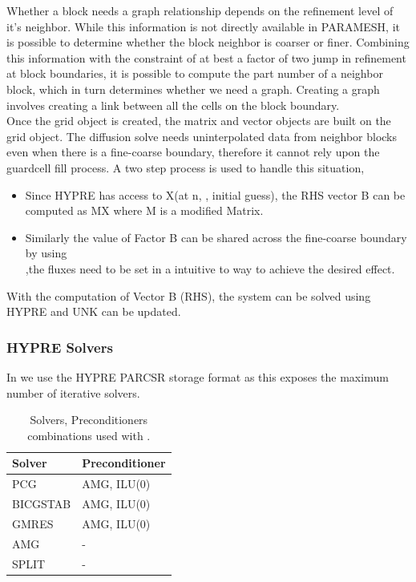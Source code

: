 Whether a block needs a graph relationship depends on the refinement
level of it's neighbor. While this information is not directly
available in PARAMESH, it is possible to determine whether the block
neighbor is coarser or finer. Combining this information with the
constraint of at best a factor of two jump in refinement at block
boundaries, it is possible to compute the 
part number of a neighbor block, which in turn determines whether we need a graph. Creating a graph involves creating a link between all the cells on
the block boundary. \\

Once the grid object is created, the matrix and vector objects are
built on the grid object. The diffusion solve needs uninterpolated data from 
neighbor blocks even when there is a fine-coarse boundary, therefore
it cannot rely upon the guardcell fill process.
 A two step process is used to handle this situation, \\

\begin{itemize}
\item {Since HYPRE has access to X(at n, \ie, initial guess), the RHS vector B can be computed as MX where M is a modified Matrix.}
\item {Similarly the value of Factor B can be shared across the fine-coarse boundary by using \\
,the fluxes need to be set in a intuitive to way to achieve the desired effect.} \\
\end{itemize}

With the computation of Vector B (RHS), the system can be solved using HYPRE and UNK can be updated. \\

\subsubsection{HYPRE Solvers}
\label{Sec:Hypre Solvers}
In \flashx  we use the HYPRE PARCSR storage format as this exposes the maximum number of iterative solvers. 

\begin{center}
\begin{longtable}{ll}
\caption{ \label{Tab:HYPRE solver types} Solvers, Preconditioners combinations used with .} \\
Solver        & Preconditioner  \\
\hline
PCG & AMG, ILU(0) \\
BICGSTAB & AMG, ILU(0) \\
GMRES & AMG, ILU(0) \\
AMG & - \\
SPLIT & - \\
\hline
\end{longtable}
\end{center}

